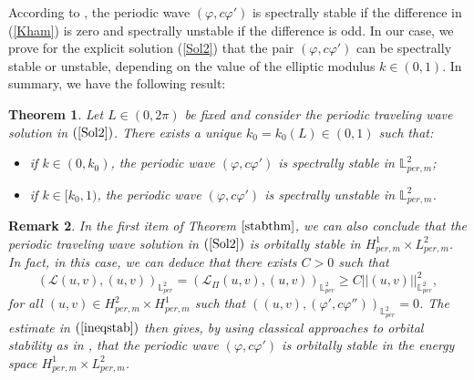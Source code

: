 \documentclass[12pt,reqno,a4paper]{amsart} %
\numberwithin{equation}{section}
\numberwithin{figure}{section}
\newtheorem{theorem}{Theorem}[section]
\newtheorem{remark}[theorem]{Remark}
\begin{document}
  According to \cite[Theorem 7.1.5]{kapitula}, the periodic wave $(\varphi,c\varphi')$ is spectrally stable if the difference in (\ref{Kham}) is zero and spectrally unstable if the difference is odd. In our case, we prove for the explicit solution (\ref{Sol2}) that the pair $(\varphi,c\varphi')$ can be spectrally stable or unstable, depending on the value of the elliptic modulus $k\in (0,1)$. In summary, we have the following result:

\begin{theorem} \label{stabthm}
	Let $L\in(0,2\pi)$ be fixed and consider the periodic traveling wave solution in $(\ref{Sol2})$. There exists a unique $k_0=k_0(L) \in (0,1)$ such that:
	\begin{itemize}
		\item [(i)] if $k\in (0,k_0)$, the periodic wave $(\varphi,c\varphi')$ is spectrally stable in $\mathbb{L}_{per,m}^2$;
		\item [(ii)] if $k\in [k_0,1)$, the periodic wave $(\varphi,c\varphi')$ is spectrally unstable in $\mathbb{L}_{per,m}^2$.
	\end{itemize}
\end{theorem}
\begin{remark} In the first item of Theorem $\ref{stabthm}$, we can also conclude that the periodic traveling wave solution in $(\ref{Sol2})$ is orbitally stable in $H_{per,m}^1\times L_{per,m}^2$. In fact, in this case, we can deduce that there exists $C>0$ such that
\begin{equation}\label{ineqstab}
(\mathcal{L}(u,v),(u,v))_{\mathbb{L}_{per}^2}=(\mathcal{L}_{\Pi}(u,v),(u,v))_{\mathbb{L}_{per}^2}\geq C||(u,v)||_{\mathbb{L}_{per}^2}^2,
\end{equation}
for all $(u,v)\in H_{per,m}^2\times H_{per,m}^1$ such that $((u,v),(\varphi',c\varphi''))_{\mathbb{L}_{per}^2}=0$.
The estimate in $(\ref{ineqstab})$ then gives, by using classical approaches to orbital stability as in \cite{grillakis1}, that the periodic wave $(\varphi,c\varphi')$ is orbitally stable in the energy space $H_{per,m}^1\times L_{per,m}^2$. %
\end{remark}
\end{document}
